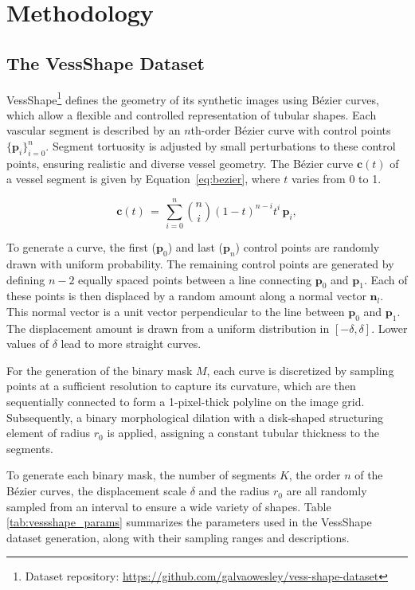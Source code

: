 \documentclass[%
reprint,
nofootinbib,
 amsmath,amssymb,
aps,
superscriptaddress,
showkeys,
longbibliography
]{revtex4-1}
\begin{document}
\section{Methodology}
\label{s:methodology}

\subsection{The VessShape Dataset}

VessShape\footnote{{Dataset repository}: \url{https://github.com/galvaowesley/vess-shape-dataset}} defines the geometry of its synthetic images using Bézier curves, which allow a flexible and controlled representation of tubular shapes. Each vascular segment is described by an $n$th-order Bézier curve with control points $\{\mathbf{p}_i\}_{i=0}^n$. Segment tortuosity is adjusted by small perturbations to these control points, ensuring realistic and diverse vessel geometry. The Bézier curve $\mathbf{c}(t)$ of a vessel segment is given by Equation~\ref{eq:bezier}, where $t$ varies from 0 to 1.

\begin{equation}
\mathbf{c}(t) \,=\, \sum_{i=0}^{n} \binom{n}{i} (1-t)^{n-i} t^{i} \, \mathbf{p}_i,
\label{eq:bezier}
\end{equation}

To generate a curve, the first ($\mathbf{p}_0$) and last ($\mathbf{p}_n$) control points are randomly drawn with uniform probability. The remaining control points are generated by defining $n-2$ equally spaced points between a line connecting $\mathbf{p}_0$ and $\mathbf{p}_1$. Each of these points is then displaced by a random amount along a normal vector $\mathbf{n}_l$. This normal vector is a unit vector perpendicular to the line between $\mathbf{p}_0$ and $\mathbf{p}_1$. The displacement amount is drawn from a uniform distribution in $[-\delta,\delta]$. Lower values of $\delta$ lead to more straight curves.

For the generation of the binary mask $M$, each curve is discretized by sampling points at a sufficient resolution to capture its curvature, which are then sequentially connected to form a 1-pixel-thick polyline on the image grid. Subsequently, a binary morphological dilation with a disk-shaped structuring element of radius $r_0$ is applied, assigning a constant tubular thickness to the segments. 

To generate each binary mask, the number of segments $K$, the order $n$ of the Bézier curves, the displacement scale $\delta$ and the radius $r_0$ are all randomly sampled from an interval to ensure a wide variety of shapes. Table \ref{tab:vessshape_params} summarizes the parameters used in the VessShape dataset generation, along with their sampling ranges and descriptions.
\end{document}
